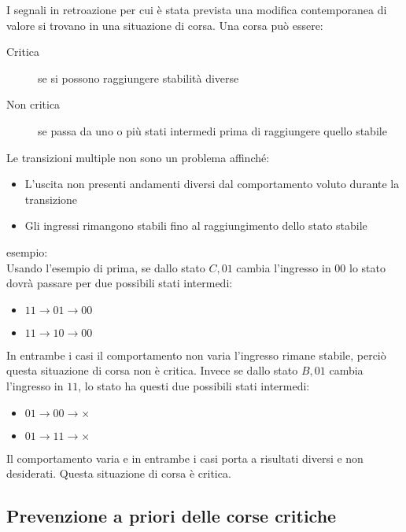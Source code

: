 \documentclass{article}
\begin{document}
I segnali in retroazione per cui è stata prevista una modifica contemporanea di valore si trovano in una situazione di corsa.
Una corsa può essere:

\begin{description}
    \item[Critica] se si possono raggiungere stabilità diverse
    \item[Non critica] se passa da uno o più stati intermedi prima di raggiungere quello stabile
\end{description}

\noindent
Le transizioni multiple non sono un problema affinché:

\begin{itemize}
    \item L'uscita non presenti andamenti diversi dal comportamento voluto durante la transizione
    \item Gli ingressi rimangono stabili fino al raggiungimento dello stato stabile
\end{itemize}

\noindent
esempio:\\

\noindent
Usando l'esempio di prima, se dallo stato $C,01$ cambia l'ingresso in $00$ lo stato dovrà passare per due possibili stati intermedi:

\begin{itemize}
\item $11 \to 01 \to 00$
\item $11 \to 10 \to 00$
\end{itemize}

\noindent
In entrambe i casi il comportamento non varia l'ingresso rimane stabile, perciò questa situazione di corsa non è critica.
Invece se dallo stato $B,01$ cambia l'ingresso in $11$, lo stato ha questi due possibili stati intermedi:

\begin{itemize}
\item $01 \to 00 \to \times$
\item $01 \to 11 \to \times$
\end{itemize}

\noindent
Il comportamento varia e in entrambe i casi porta a risultati diversi e non desiderati.
Questa situazione di corsa è critica.

\subsection{Prevenzione a priori delle corse critiche}
\end{document}

